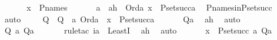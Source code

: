 \begin{isabellebody}
%
\isadelimproof
%
\endisadelimproof
%
\isatagproof
{}\isamarkupfalse%
\ {\isacharminus}{\kern0pt}\ \isanewline
\ \ \isamarkupfalse%
\ {\isachardoublequoteopen}x\ {\isasymin}\ P{\isacharunderscore}{\kern0pt}names{\isachardoublequoteclose}\ \isanewline
\ \ \isamarkupfalse%
\ \isamarkupfalse%
\ a\ \ ah\ {\isacharcolon}{\kern0pt}\ {\isachardoublequoteopen}Ord{\isacharparenleft}{\kern0pt}a{\isacharparenright}{\kern0pt}{\isachardoublequoteclose}\ {\isachardoublequoteopen}x\ {\isasymin}\ P{\isacharunderscore}{\kern0pt}set{\isacharparenleft}{\kern0pt}succ{\isacharparenleft}{\kern0pt}a{\isacharparenright}{\kern0pt}{\isacharparenright}{\kern0pt}{\isachardoublequoteclose}\ \isamarkupfalse%
\ P{\isacharunderscore}{\kern0pt}names{\isacharunderscore}{\kern0pt}in{\isacharunderscore}{\kern0pt}P{\isacharunderscore}{\kern0pt}set{\isacharunderscore}{\kern0pt}succ\ \isamarkupfalse%
\ auto\ \isanewline
\isanewline
\ \ \isamarkupfalse%
\ Q\ \ {\isachardoublequoteopen}Q\ {\isasymequiv}\ {\isasymlambda}a{\isachardot}{\kern0pt}\ Ord{\isacharparenleft}{\kern0pt}a{\isacharparenright}{\kern0pt}\ {\isasymand}\ x\ {\isasymin}\ P{\isacharunderscore}{\kern0pt}set{\isacharparenleft}{\kern0pt}succ{\isacharparenleft}{\kern0pt}a{\isacharparenright}{\kern0pt}{\isacharparenright}{\kern0pt}{\isachardoublequoteclose}\ \isanewline
\ \ \isamarkupfalse%
\ \isamarkupfalse%
\ {\isachardoublequoteopen}Q{\isacharparenleft}{\kern0pt}a{\isacharparenright}{\kern0pt}{\isachardoublequoteclose}\ \isamarkupfalse%
\ ah\ \isamarkupfalse%
\ auto\isanewline
\ \ \isamarkupfalse%
\ \isamarkupfalse%
\ {\isachardoublequoteopen}Q{\isacharparenleft}{\kern0pt}{\isasymmu}\ a{\isachardot}{\kern0pt}\ Q{\isacharparenleft}{\kern0pt}a{\isacharparenright}{\kern0pt}{\isacharparenright}{\kern0pt}{\isachardoublequoteclose}\ \isanewline
\ \ \ \ \isamarkupfalse%
\ {\isacharparenleft}{\kern0pt}rule{\isacharunderscore}{\kern0pt}tac\ i{\isacharequal}{\kern0pt}a\ \ LeastI{\isacharparenright}{\kern0pt}\ \isamarkupfalse%
\ ah\ \isamarkupfalse%
\ auto\ \isanewline
\ \ \isamarkupfalse%
\ \isamarkupfalse%
\ {\isachardoublequoteopen}x\ {\isasymin}\ P{\isacharunderscore}{\kern0pt}set{\isacharparenleft}{\kern0pt}succ{\isacharparenleft}{\kern0pt}{\isasymmu}\ a{\isachardot}{\kern0pt}\ Q{\isacharparenleft}{\kern0pt}a{\isacharparenright}{\kern0pt}{\isacharparenright}{\kern0pt}{\isacharparenright}{\kern0pt}{\isachardoublequoteclose}\ \isamarkupfalse%

\end{isabellebody}
